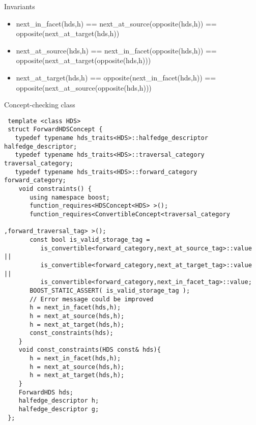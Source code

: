 \begin{Desc}
\item[Invariants ]\begin{itemize}
\item next\_\-in\_\-facet(hds,h) == next\_\-at\_\-source(opposite(hds,h)) == opposite(next\_\-at\_\-target(hds,h))\item next\_\-at\_\-source(hds,h) == next\_\-in\_\-facet(opposite(hds,h)) == opposite(next\_\-at\_\-target(opposite(hds,h)))\item next\_\-at\_\-target(hds,h) == opposite(next\_\-in\_\-facet(hds,h)) == opposite(next\_\-at\_\-source(opposite(hds,h)))\end{itemize}
\end{Desc}
\begin{Desc}
\item[Concept-checking class]

\begin{Code}\begin{verbatim} template <class HDS> 
 struct ForwardHDSConcept {
   typedef typename hds_traits<HDS>::halfedge_descriptor halfedge_descriptor; 
   typedef typename hds_traits<HDS>::traversal_category traversal_category;
   typedef typename hds_traits<HDS>::forward_category forward_category;
    void constraints() {
       using namespace boost;
       function_requires<HDSConcept<HDS> >();
       function_requires<ConvertibleConcept<traversal_category
                                                ,forward_traversal_tag> >();  
       const bool is_valid_storage_tag =
          is_convertible<forward_category,next_at_source_tag>::value ||
          is_convertible<forward_category,next_at_target_tag>::value ||
          is_convertible<forward_category,next_in_facet_tag>::value;
       BOOST_STATIC_ASSERT( is_valid_storage_tag ); 
       // Error message could be improved
       h = next_in_facet(hds,h);
       h = next_at_source(hds,h);
       h = next_at_target(hds,h);
       const_constraints(hds);
    }
    void const_constraints(HDS const& hds){
       h = next_in_facet(hds,h);
       h = next_at_source(hds,h);
       h = next_at_target(hds,h);
    }
    ForwardHDS hds;
    halfedge_descriptor h;
    halfedge_descriptor g;
 };
\end{verbatim}\end{Code}

 \end{Desc}
